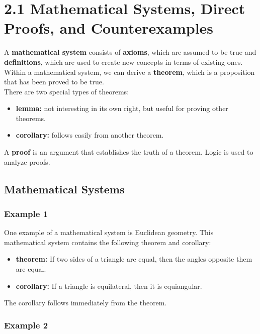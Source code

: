\section*{2.1 Mathematical Systems, Direct Proofs, and Counterexamples}

A \textbf{mathematical system} consists of \textbf{axioms}, which are assumed to be true and \textbf{definitions}, which are used to create new concepts in terms of existing ones.  Within a mathematical system, we can derive a \textbf{theorem}, which is a proposition that has been proved to be true.\\

There are two special types of theorems:

\begin{itemize}
    \item \textbf{lemma:} not interesting in its own right, but useful for proving other theorems.
    \item \textbf{corollary:} follows easily from another theorem.
\end{itemize}

A \textbf{proof} is an argument that establishes the truth of a theorem.  Logic is used to analyze proofs.

\subsection*{Mathematical Systems}

\subsubsection*{Example 1}

One example of a mathematical system is Euclidean geometry.  This mathematical system contains the following theorem and corollary:

\begin{itemize}
    \item \textbf{theorem:} If two sides of a triangle are equal, then the angles opposite them are equal.
    \item \textbf{corollary:} If a triangle is equilateral, then it is equiangular.
\end{itemize}

The corollary follows immediately from the theorem.

\subsubsection*{Example 2}


